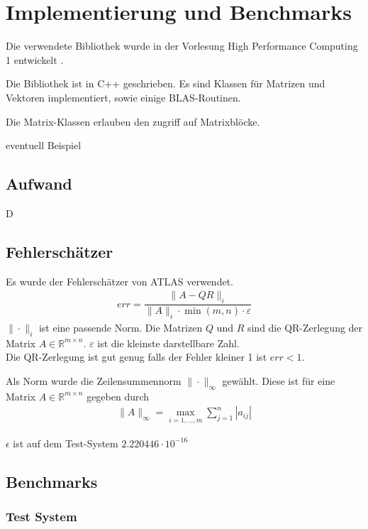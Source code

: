 \chapter{Implementierung und Benchmarks}
Die verwendete Bibliothek wurde in der Vorlesung High Performance Computing 1 entwickelt \cite{HPC1}.

Die Bibliothek ist in C++ geschrieben. Es sind Klassen für Matrizen und Vektoren implementiert, sowie einige BLAS-Routinen.

Die Matrix-Klassen erlauben den zugriff auf Matrixblöcke. 



eventuell Beispiel

\section{Aufwand}

D

\section{Fehlerschätzer}

Es wurde der Fehlerschätzer von ATLAS\cite{atlas} verwendet.
\begin{align}
	err = \dfrac{\|A - QR\|_i}{\|A\|_i \cdot \min(m,n) \cdot \varepsilon}
\end{align}
$\|\cdot\|_i$ ist eine passende Norm.
Die Matrizen $Q$ und $R$ sind die QR-Zerlegung der Matrix $A \in \mathbb{R}^{m \times n}$.
$\varepsilon$ ist die kleinste darstellbare Zahl.\\
Die QR-Zerlegung ist gut genug falls der Fehler kleiner 1 ist $ err < 1 $.

Als Norm wurde die Zeilensummennorm $\|\cdot\|_\infty$ gewählt.
Diese ist für eine Matrix $A \in \mathbb{R}^{m\times n}$ gegeben durch
\begin{align*}
	\|A\|_\infty = \max_{i=1,...,m} \sum_{j=1}^{n} |a_{ij}|
\end{align*}

$\epsilon$ ist auf dem Test-System $2.220446\cdot10^{-16}$


\section{Benchmarks}

\subsection{Test System}

